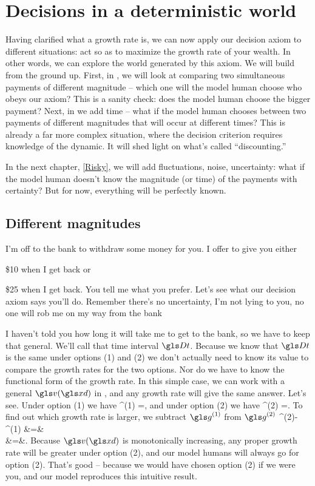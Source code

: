 \section{Decisions in a deterministic world}
Having clarified what a growth rate is, we can now apply our decision axiom to different situations: 
act so as to maximize the growth rate of your wealth. In other words, we can explore the world 
generated by this axiom. We will build from the ground up. First, in , 
we will look at comparing two simultaneous payments of different magnitude -- which one will the 
model human choose who obeys our axiom? This is a sanity check: does the model human 
choose the bigger payment? Next, in  we add time -- what if 
the model human chooses between two payments of different magnitudes that will occur at different 
times? This is already a far more complex situation, where the decision criterion requires knowledge 
of the dynamic. It will shed light on what's called ``discounting.'' 

In the next chapter, \cref{Risky}, we will add fluctuations, noise, uncertainty: what if the 
model human doesn't know the magnitude (or time) of the payments with certainty? But for now, 
everything will be perfectly known.

\subsection{Different magnitudes}
I'm off to the bank to withdraw some money for you. I offer to give you either
\bi
\item[(1)] \$10 when I 
get back or 
\item[(2)] \$25 when I get back. You tell me what you prefer.
\ei
Let's see what our decision axiom says you'll do. Remember there's no uncertainty, I'm not lying to 
you, no one will rob me on my way from the bank \etc

I haven't told you how long it will take me to get to the bank, so we have to keep that general. We'll 
call that time interval $\Dt$. Because we know that $\Dt$ is the same under options (1) and (2) we 
don't actually need to know its value to compare the growth rates for the two options. Nor do we 
have to know the functional form of the growth rate. In this simple case, we can work with a general 
$\gv(\xd)$ in , and any growth rate will give the same answer. Let's see. Under 
option (1) we have
\be
\g^{(1)} =,
\ee
and under option (2) we have
\be
\g^{(2)} =.
\ee
To find out which growth rate is larger, we subtract $\g^{(1)}$ from $\g^{(2)}$ 
\bea
\g^{(2)}-\g^{(1)} &=&\\
 &=&.
\eea
Because $\gv(\xd)$ is monotonically increasing, any proper growth rate will be greater under option (2), and 
our model humans will always go for option (2). That's good -- because we would have chosen option (2) if we were you, and 
our model reproduces this intuitive result.

